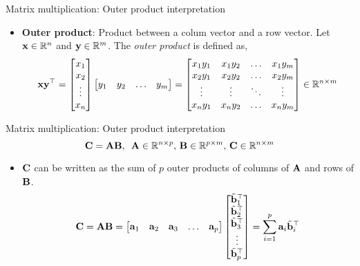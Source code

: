 \documentclass[aspectratio=169]{beamer}
\begin{document}
\begin{frame}[t]{Matrix multiplication: Outer product interpretation}
  \begin{itemize}
    \item \textbf{Outer product}: Product between a colum vector and a row vector. Let $\mathbf{x} \in \mathbb{R}^n$ and $\mathbf{y} \in \mathbb{R}^m$. The \textit{outer product} is defined as,
    \[ \mathbf{x}\mathbf{y}^{\top} = \begin{bmatrix}
      x_1\\ x_2\\ \vdots \\x_n
    \end{bmatrix} \begin{bmatrix}
      y_1 &  y_2 & \ldots & y_m
    \end{bmatrix} = \begin{bmatrix}
      x_1y_1 &  x_1y_2 & \ldots & x_1y_m \\
      x_2y_1 &  x_2y_2 & \ldots & x_2y_m \\
      \vdots &  \vdots & \ddots & \vdots \\
      x_ny_1 &  x_ny_2 & \ldots & x_ny_m \\
    \end{bmatrix} \in \mathbb{R}^{n \times m} \]
  \end{itemize}
\end{frame}


\begin{frame}[t]{Matrix multiplication: Outer product interpretation}
  \[ \mathbf{C} = \mathbf{A}\mathbf{B}, \,\,\, \mathbf{A} \in \mathbb{R}^{n \times p}, \, \mathbf{B} \in \mathbb{R}^{p \times m}, \, \mathbf{C} \in \mathbb{R}^{n \times m} \]
  \begin{itemize}
    \item $\mathbf{C}$ can be written as the sum of $p$ outer products of columns of $\mathbf{A}$ and rows of $\mathbf{B}$.
    \[ \mathbf{C} = \mathbf{A}\mathbf{B} = \begin{bmatrix}
      \mathbf{a}_1 & \mathbf{a}_2 & \mathbf{a}_3 & \ldots & \mathbf{a}_p
    \end{bmatrix} \begin{bmatrix}
      \tilde{\mathbf{b}}_1^{\top} \\
      \tilde{\mathbf{b}}_2^{\top} \\
      \tilde{\mathbf{b}}_3^{\top} \\
      \vdots \\
      \tilde{\mathbf{b}}_p^{\top}
    \end{bmatrix} = \sum_{i=1}^{p}\mathbf{a}_i\tilde{\mathbf{b}}_i^{\top} \]
  \end{itemize}
\end{frame}
\end{document}
